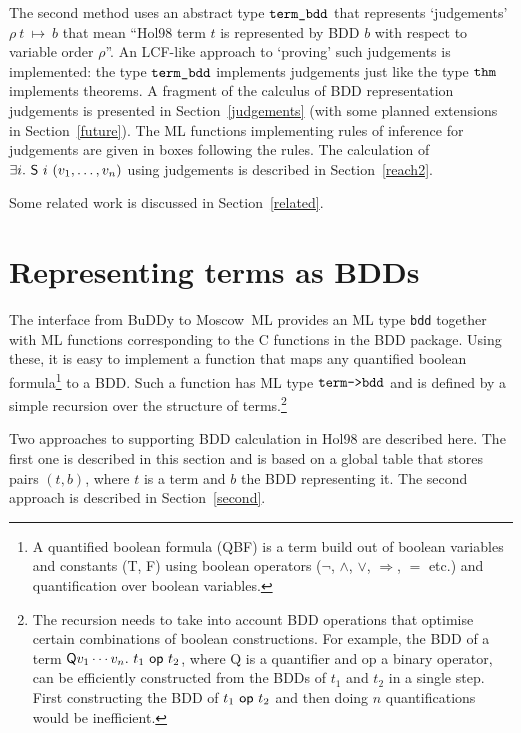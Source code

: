 \documentclass[12pt]{article}
\newcommand{\tyind}[1]{\index[MLty]{#1}}
\newcommand{\con}[1]{\mbox{\sf #1}}
\newcommand{\ty}[1]{\mbox{\tt #1}}
\newcommand{\ml}[1]{{\tt #1}}
\newcommand{\termbdd}[3]{\mbox{$#1~#2~\mapsto~#3$}}
\newcommand\termbddty{\ty{term\_bdd}}
\newcommand\Hol{Hol98\xspace}
\newcommand{\mosml}{Moscow~ML\xspace}
\newcommand{\Buddy}{BuDDy\xspace}
\newcommand\fun{\mbox{\tt{->}}}
\newcommand\imp{{\Rightarrow}}
\begin{document}
The second method uses an abstract type $\termbddty$\tyind{\ml{term\_bdd}} that represents
`judgements' $\termbdd{\rho}{t}{b}$ that mean ``\Hol{} term $t$ is
represented by BDD $b$ with respect to variable order $\rho$''.  An
LCF-like approach to `proving' such judgements is implemented: the
type $\termbddty$ implements judgements just like the type $\ty{thm}$
implements theorems.  A fragment of the calculus of BDD representation
judgements is presented in Section~\ref{judgements} (with some planned
extensions in Section~\ref{future}). The ML functions implementing
rules of inference for judgements are given in boxes following the
rules. The calculation of $\exists i.~ \con{S}~i~(v_1,\ldots,v_n)$
using judgements is described in Section~\ref{reach2}.

Some related work is discussed in Section~\ref{related}.

\section{Representing terms as BDDs}\label{method1}

The interface from \Buddy{} to \mosml{} provides an ML type \ty{bdd}\tyind{\ml{bdd}} together with
ML functions corresponding to the C functions in the BDD
package.
Using these, it is easy to implement a function that maps any quantified
boolean formula\footnote{A quantified boolean formula (QBF) is a term
build out of boolean variables and constants (\con{T}, \con{F}) using
boolean operators ($\neg$, $\wedge$, $\vee$, $\imp$, $=$ etc.) and
quantification over boolean variables.} to a
BDD. Such a function has ML type $\ty{term}\fun\ty{bdd}$ and is
defined by a simple recursion over the structure of
terms.\footnote{The recursion needs to take into account BDD
operations that optimise certain combinations of boolean
constructions. For example, the BDD of a term $\con{Q}v_1\cdots
v_n.~t_1~\con{op}~t_2$, where \con{Q} is a quantifier and \con{op} a
binary operator, can be efficiently constructed from the BDDs of $t_1$
and $t_2$ in a single step. First constructing the BDD of
$t_1~\con{op}~t_2$ and then doing $n$ quantifications would be
inefficient.}

Two approaches to supporting BDD calculation in \Hol{} are described
here. The first one is described in this section and is based on a global
table that stores pairs $(t,b)$, where $t$ is a term and $b$ the BDD
representing it. The second approach is described in
Section~\ref{second}. 
\end{document}
